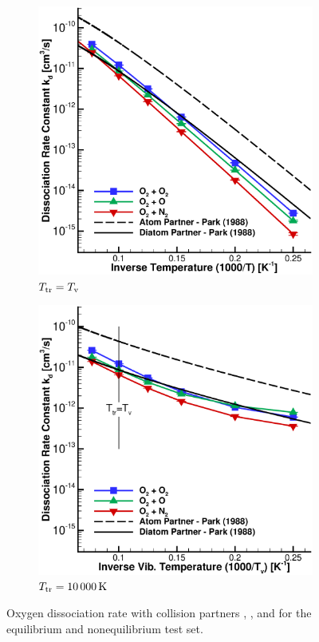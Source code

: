 \begin{figure}[p]
   \centering
   \begin{subfigure}[t]{\twofigwidth\textwidth}
      \centering
      \includegraphics[width=\textwidth]{./figures/O2-Dissoc_AllPartners_Equil.eps}
      \caption{$T_\mathrm{tr}=T_\mathrm{v}$}
   \end{subfigure}
%
   \begin{subfigure}[t]{\twofigwidth\textwidth}
      \centering
      \includegraphics[width=\textwidth]{./figures/O2-Dissoc_AllPartners_Nonequil.eps}
      \caption{$T_\mathrm{tr}=\SI{10000}{\kelvin}$}
   \end{subfigure}
   \caption[Oxygen dissociation with various parameters]
      {Oxygen dissociation rate with collision partners , , and 
         for the equilibrium and nonequilibrium test set.}
   \label{fig:O2-Dissoc_Rates}
\end{figure}

